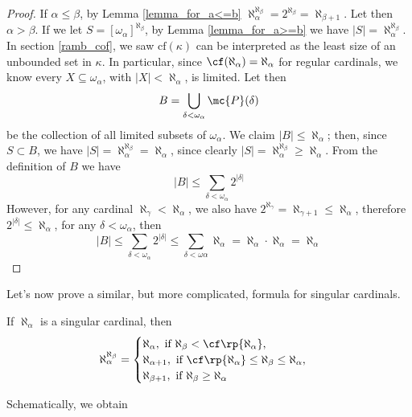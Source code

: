 \begin{proof}
    If $\alpha\leq\beta$, by Lemma \ref{lemma_for_a<=b} $\aleph_\alpha^{\aleph_\beta}=2^{\aleph_\beta}=\aleph_{\beta+1}$. Let then $\alpha>\beta$. If we let $S=[\omega_\alpha]^{\aleph_\beta}$, by Lemma \ref{lemma_for_a>=b} we have $|S|=\aleph_\alpha^{\aleph_\beta}$. In section \ref{ramb_cof}, we saw $\text{cf}(\kappa)$ can be interpreted as the least size of an unbounded set in $\kappa$. In particular, since $\cf(\aleph_\alpha)=\aleph_\alpha$ for regular cardinals, we know every $X\subseteq\omega_\alpha$, with $|X|<\aleph_\alpha$, is limited. Let then
    $$B=\bigcup_{\delta<\omega_\alpha}\mc{P}(\delta)$$
    be the collection of all limited subsets of $\omega_\alpha$. We claim $|B|\leq\aleph_\alpha$; then, since $S\subset B$, we have $|S|=\aleph_\alpha^{\aleph_\beta}=\aleph_\alpha$, since clearly $|S|=\aleph_\alpha^{\aleph_\beta}\geq\aleph_\alpha$. From the definition of $B$ we have
    $$|B|\leq\sum_{\delta<\omega_\alpha}2^{|\delta|}$$
    However, for any cardinal $\aleph_\gamma<\aleph_\alpha$, we also have $2^{\aleph_\gamma}=\aleph_{\gamma+1}\leq\aleph_\alpha$, therefore $2^{|\delta|}\leq\aleph_\alpha$, for any $\delta<\omega_\alpha$, then
    $$|B|\leq\sum_{\delta<\omega_\alpha}2^{|\delta|}\leq\sum_{\delta<\omega\alpha}\aleph_\alpha=\aleph_\alpha\cdot\aleph_\alpha=\aleph_\alpha$$
\end{proof}

Let's now prove a similar, but more complicated, formula for singular cardinals.

\begin{lemma}{}{}
    If $\aleph_\alpha$ is a singular cardinal, then
    $$\aleph_\alpha^{\aleph_\beta}=\begin{cases}
        \aleph_\alpha,\text{ if }\aleph_\beta<\cf\rp{\aleph_\alpha},\\
        \aleph_{\alpha+1},\text{ if }\cf\rp{\aleph_\alpha}\leq\aleph_\beta\leq\aleph_\alpha,\\
        \aleph_{\beta+1},\text{ if }\aleph_\beta\geq\aleph_\alpha
    \end{cases}$$
\end{lemma}

Schematically, we obtain


